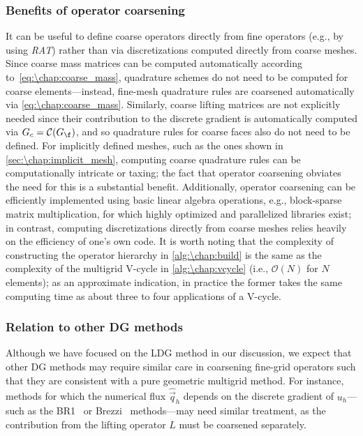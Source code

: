 \subsubsection{Benefits of operator coarsening}
It can be useful to define coarse operators directly from fine operators (e.g., by using \textit{RAT}) rather than via discretizations computed directly from coarse meshes. Since coarse mass matrices can be computed automatically according to~\cref{eq:\chap:coarse_mass}, quadrature schemes do not need to be computed for coarse elements---instead, fine-mesh quadrature rules are coarsened automatically via \cref{eq:\chap:coarse_mass}. Similarly, coarse lifting matrices are not explicitly needed since their contribution to the discrete gradient is automatically computed via $G_c = \mathcal{C}(G_\f)$, and so quadrature rules for coarse faces also do not need to be defined. For implicitly defined meshes, such as the ones shown in \cref{sec:\chap:implicit_mesh}, computing coarse quadrature rules can be computationally intricate or taxing; the fact that operator coarsening obviates the need for this is a substantial benefit. Additionally, operator coarsening can be efficiently implemented using basic linear algebra operations, e.g., block-sparse matrix multiplication, for which highly optimized and parallelized libraries exist; in contrast, computing discretizations directly from coarse meshes relies heavily on the efficiency of one's own code. It is worth noting that the complexity of constructing the operator hierarchy in \cref{alg:\chap:build} is the same as the complexity of the multigrid V-cycle in \cref{alg:\chap:vcycle} (i.e., $\mathcal{O}(N)$ for $N$ elements); as an approximate indication, in practice the former takes the same computing time as about three to four applications of a V-cycle.

\subsubsection{Relation to other DG methods}
Although we have focused on the LDG method in our discussion, we expect that other DG methods may require similar care in coarsening fine-grid operators such that they are consistent with a pure geometric multigrid method. For instance, methods for which the numerical flux $\widehat{\vec{q}}_h$ depends on the discrete gradient of $u_h$---such as the BR1~\cite{Bassi_97_01} or Brezzi~\cite{Brezzi_00_01} methods---may need similar treatment, as the contribution from the lifting operator $L$ must be coarsened separately.

